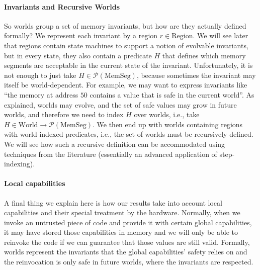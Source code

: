 \documentclass[acmsmall,review]{acmart}\settopmatter{printfolios=true}
\newcommand{\powerset}[1]{\mathcal{P}(#1)}
\newcommand{\plaindom}[1]{\mathrm{#1}}
\newcommand{\HeapSegments}{\plaindom{MemSeg}}
\newcommand{\MemSegments}{\HeapSegments}
\newcommand{\Regions}{\plaindom{Region}}
\newcommand{\Worlds}{\plaindom{World}}
\begin{document}
\paragraph{Invariants and Recursive Worlds}
So worlds group a set of memory invariants, but how are they actually
defined formally? We represent each invariant by a region
$r \in \Regions$. We will see later that regions contain state
machines to support a notion of evolvable invariants, but in every
state, they also contain a predicate $H$ that defines which memory
segments are acceptable in the current state of the invariant.
Unfortunately, it is not enough to just take
$H \in \powerset{\MemSegments}$, because sometimes the invariant may
itself be world-dependent. For example, we may want to express
invariants like ``the memory at address $50$ contains a value that is
safe in the current world''. As explained, worlds may evolve, and the
set of safe values may grow in future worlds, and therefore we need to
index $H$ over worlds, i.e., take
$H \in \Worlds \rightarrow \powerset{\MemSegments}$. We then end up
with worlds containing regions with world-indexed predicates,
i.e., the set of worlds must be recursively defined. We will see how such a recursive
definition can be accommodated using techniques from the
literature (essentially an advanced application of step-indexing).

\paragraph{Local capabilities}
A final thing we explain here is how our results take into account local
capabilities and their special treatment by the hardware. Normally, when we
invoke an untrusted piece of code and provide it with certain global
capabilities, it may have stored those capabilities in memory and we will only
be able to reinvoke the code if we can guarantee that those values are still
valid. Formally, worlds represent the invariants that the global capabilities'
safety relies on and the reinvocation is only safe in future worlds, where the
invariants are respected.
\end{document}

